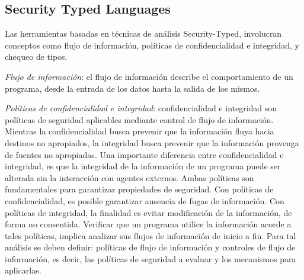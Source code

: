 \subsection{Security Typed Languages}
Las herramientas basadas en técnicas de análisis Security-Typed, involucran
conceptos como flujo de información, políticas de confidencialidad e integridad,
y chequeo de tipos.

\emph{Flujo de información}: el flujo de información describe el
comportamiento de un programa, desde la entrada de los datos hasta la salida de
los mismos. 

\emph{Políticas de confidencialidad e integridad}: confidencialidad e integridad
son políticas de seguridad aplicables mediante control de flujo de información.
Mientras la confidencialidad busca prevenir que la información fluya hacia
destinos no apropiados, la integridad busca prevenir que la información provenga
de fuentes no apropiadas\cite{LanguageIFS-2013}. Una importante diferencia
entre confidencialidad e integridad, es que la integridad de la información de un programa puede ser
alterada sin la interacción con agentes externos.\newline %
Ambas políticas son fundamentales para garantizar propiedades de
seguridad.\newline 
Con políticas de confidencialidad, es posible garantizar ausencia de fugas de
información. Con políticas de integridad, la finalidad es evitar
modificación de la información, de forma no consentida.\newline 
Verificar que un programa utilice la información acorde a
tales políticas, implica analizar sus flujos de información de inicio a fin.
Para tal análisis se deben definir: políticas de flujo de información y
controles de flujo de información, es decir, las políticas de seguridad a
evaluar y los mecanismos para aplicarlas. 

